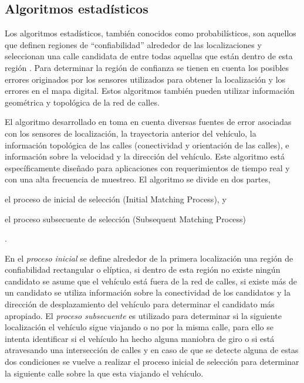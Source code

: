 \subsection{Algoritmos estadísticos}

Los algoritmos estadísticos, también conocidos como probabilísticos, son aquellos que definen regiones de “confiabilidad” alrededor de las localizaciones y seleccionan una calle candidata de entre todas aquellas que están dentro de esta región \cite{quddus2007current}. Para determinar la región de confianza se tienen en cuenta los posibles errores originados por los sensores utilizados para obtener la localización y los errores en el mapa digital. Estos algoritmos también pueden utilizar información geométrica y topológica de la red de calles.

El algoritmo desarrollado en \cite{ochieng2009map} toma en cuenta diversas fuentes de error asociadas con los sensores de localización, la trayectoria anterior del vehículo, la información topológica de las calles (conectividad y orientación de las calles), e información sobre la velocidad y la dirección del vehículo. Este algoritmo está específicamente diseñado para aplicaciones con requerimientos de tiempo real y con una alta frecuencia de muestreo. El algoritmo se divide en dos partes, \begin{enumerate*}[a)]
\item el proceso de inicial de selección (Initial Matching Process), y \item el proceso subsecuente de selección (Subsequent Matching Process)\end{enumerate*}. 

En el \emph{proceso inicial} se define alrededor de la primera localización una región de confiabilidad rectangular o elíptica, si dentro de esta región no existe ningún candidato se asume que el vehículo está fuera de la red de calles, si existe más de un candidato se utiliza información sobre la conectividad de los candidatos y la dirección de desplazamiento del vehículo para determinar el candidato más apropiado. El \emph{proceso subsecuente} es utilizado para determinar si la siguiente localización el vehículo sigue viajando o no por la misma calle, para ello se intenta identificar si el vehículo ha hecho alguna maniobra de giro o si está atravesando una intersección de calles y en caso de que se detecte alguna de estas dos condiciones se vuelve a realizar el proceso inicial de selección para determinar la siguiente calle sobre la que esta viajando el vehículo.

